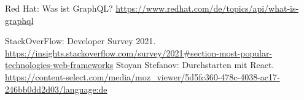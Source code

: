 \begin{thebibliography}{HR08}
Red Hat: Was ist GraphQL? \url{https://www.redhat.com/de/topics/api/what-is-graphql}

StackOverFlow: Developer Survey 2021. \url{https://insights.stackoverflow.com/survey/2021#section-most-popular-technologies-web-frameworks}
Stoyan Stefanov: Durchstarten mit React. \url{https://content-select.com/media/moz_viewer/5d5fc360-478c-4038-ac17-246bb0dd2d03/language:de}
\end{thebibliography}
